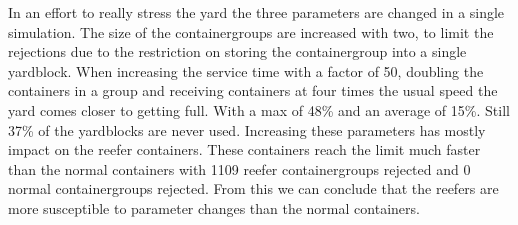 \documentclass[]{article}
\begin{document}
In an effort to really stress the yard the three parameters are changed in a
single simulation. The size of the containergroups are increased with two, to
limit the rejections due to the restriction on storing the containergroup into
a single yardblock. When increasing the service time with a factor of 50,
doubling the containers in a group and receiving containers at four times the
usual speed the yard comes closer to getting full. With a max of 48\% and an
average of 15\%. Still 37\% of the yardblocks are never used. Increasing these
parameters has mostly impact on the reefer containers. These containers reach
the limit much faster than the normal containers with 1109 reefer
containergroups rejected and 0 normal containergroups rejected. From this we
can conclude that the reefers are more susceptible to parameter changes than
the normal containers.
\end{document}

